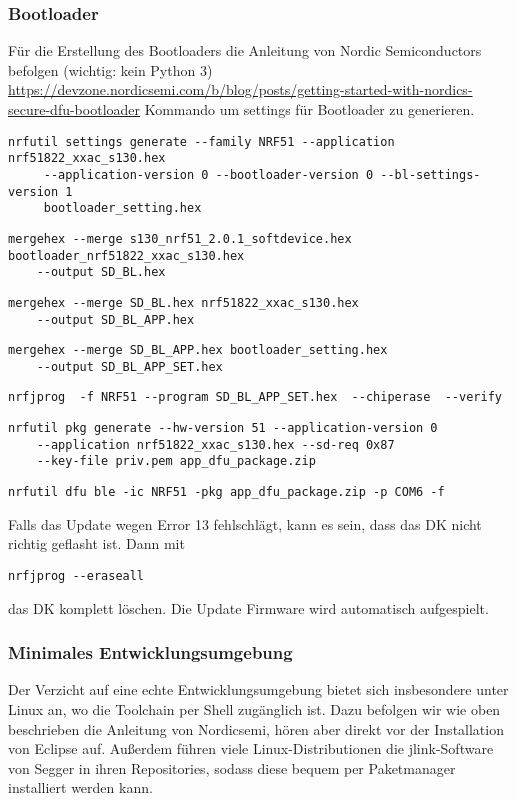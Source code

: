 \documentclass[11pt,ngerman]{scrartcl} %
\begin{document}
\subsubsection{Bootloader}
Für die Erstellung des Bootloaders die Anleitung von Nordic Semiconductors befolgen (wichtig: kein Python 3)
\url{https://devzone.nordicsemi.com/b/blog/posts/getting-started-with-nordics-secure-dfu-bootloader}
Kommando um settings für Bootloader zu generieren.
\begin{verbatim}
nrfutil settings generate --family NRF51 --application nrf51822_xxac_s130.hex 
     --application-version 0 --bootloader-version 0 --bl-settings-version 1
     bootloader_setting.hex
\end{verbatim}
\begin{verbatim}
mergehex --merge s130_nrf51_2.0.1_softdevice.hex bootloader_nrf51822_xxac_s130.hex 
	--output SD_BL.hex
\end{verbatim}
\begin{verbatim}
mergehex --merge SD_BL.hex nrf51822_xxac_s130.hex 
	--output SD_BL_APP.hex
\end{verbatim}
\begin{verbatim}
mergehex --merge SD_BL_APP.hex bootloader_setting.hex 
	--output SD_BL_APP_SET.hex
\end{verbatim}
\begin{verbatim}
nrfjprog  -f NRF51 --program SD_BL_APP_SET.hex  --chiperase  --verify
\end{verbatim}
\begin{verbatim}
nrfutil pkg generate --hw-version 51 --application-version 0 
	--application nrf51822_xxac_s130.hex --sd-req 0x87 
	--key-file priv.pem app_dfu_package.zip
\end{verbatim}
\begin{verbatim}
nrfutil dfu ble -ic NRF51 -pkg app_dfu_package.zip -p COM6 -f
\end{verbatim}
Falls das Update wegen Error 13 fehlschlägt, kann es sein, dass das DK nicht richtig geflasht ist. Dann mit 
\begin{verbatim}
nrfjprog --eraseall
\end{verbatim}
das DK komplett löschen. Die Update Firmware wird automatisch aufgespielt.

\subsubsection{Minimales Entwicklungsumgebung}
\label{sec:minimal-setup}

Der Verzicht auf eine echte Entwicklungsumgebung bietet sich insbesondere unter Linux an, wo die Toolchain per Shell zugänglich ist. Dazu befolgen wir wie oben beschrieben die Anleitung von Nordicsemi, hören aber direkt vor der Installation von Eclipse auf. Außerdem führen viele Linux-Distributionen die jlink-Software von Segger in ihren Repositories, sodass diese bequem per Paketmanager installiert werden kann.
\end{document}
